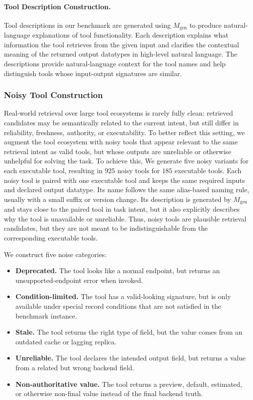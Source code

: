 \documentclass{llmxive}
\begin{document}
\paragraph{Tool Description Construction.}
Tool descriptions in our benchmark are generated using $M_{\mathrm{gen}}$ to produce natural-language explanations of tool functionality. 
Each description explains what information the tool retrieves from the given input and clarifies the contextual meaning of the returned output datatypes in high-level natural language. 
The descriptions provide natural-language context for the tool names and help distinguish tools whose input-output signatures are similar.

\subsubsection{Noisy Tool Construction}
\label{app:noisy_tool}

Real-world retrieval over large tool ecosystems is rarely fully clean: retrieved candidates may be semantically related to the current intent, but still differ in reliability, freshness, authority, or executability.
To better reflect this setting, we augment the tool ecosystem with noisy tools that appear relevant to the same retrieval intent as valid tools, but whose outputs are unreliable or otherwise unhelpful for solving the task.
To achieve this, We generate five noisy variants for each executable tool, resulting in $925$ noisy tools for $185$ executable tools.
Each noisy tool is paired with one executable tool and keeps the same required inputs and declared output datatype.
Its name follows the same alias-based naming rule, usually with a small suffix or version change.
Its description is generated by $M_{\mathrm{gen}}$ and stays close to the paired tool in task intent, but it also explicitly describes why the tool is unavailable or unreliable.
Thus, noisy tools are plausible retrieval candidates, but they are not meant to be indistinguishable from the corresponding executable tools.

We construct five noise categories:
\begin{itemize}
\item \textbf{Deprecated.} The tool looks like a normal endpoint, but returns an unsupported-endpoint error when invoked.
\item \textbf{Condition-limited.} The tool has a valid-looking signature, but is only available under special record conditions that are not satisfied in the benchmark instance.
\item \textbf{Stale.} The tool returns the right type of field, but the value comes from an outdated cache or lagging replica.
\item \textbf{Unreliable.} The tool declares the intended output field, but returns a value from a related but wrong backend field.
\item \textbf{Non-authoritative value.} The tool returns a preview, default, estimated, or otherwise non-final value instead of the final backend truth.
\end{itemize}
\end{document}
